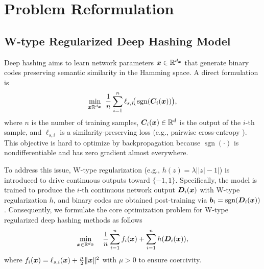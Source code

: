 \section{Problem Reformulation}
\label{Section: Problem Reformulation}
\subsection{W-type Regularized Deep Hashing Model}
Deep hashing aims to learn network parameters \(\bm{x} \in \mathbb{R}^{d_{\bm{x}}}\) that generate binary codes preserving semantic similarity in the Hamming space. A direct formulation is
\[
\min_{\bx \RR^{d_{\bx}}}\ \frac{1}{n}\sum_{i=1}^{n}\ell_{s,i}\!\big(\operatorname{sgn}(\bC_i(\bx))\big),
\]
where \(n\) is the number of training samples, \(\bm{C}_i(\bm{x})\in\mathbb{R}^d\) is the output of the \(i\)-th sample, and \(\ell_{s,i}\) is a similarity-preserving loss (e.g., pairwise cross-entropy \cite{zhuDeepHashingNetwork2016}). This objective is hard to optimize by backpropagation because \(\operatorname{sgn}(\cdot)\) is nondifferentiable and has zero gradient almost everywhere.

To address this issue, W-type regularization (e.g., \(h(z)=\lambda\bigl||z|-1\bigr|\)) is introduced to drive continuous outputs toward \(\{-1,1\}\).
Specifically, the model is trained to produce the \(i\)-th continuous network output \(\bm{D}_i(\bm{x})\) with W-type regularization \(h\), and binary codes are obtained post-training via \(\bm{b}_i = \operatorname{sgn}(\bm{D}_i(\bm{x}))\). Consequently, we formulate the core optimization problem for W-type regularized deep hashing methods as follows 
\begin{align}
\label{Eq: the primal deep hashing problem}
\min_{\bm{x} \in \mathbb{R}^{d_{\bm{x}}}} \quad \frac{1}{n}\sum_{i=1}^n f_i(\bm{x}) + \sum_{i=1}^n h(\bm{D}_i(\bm{x})),
\end{align}where \(f_i(\bm{x})=\ell_{s,i}(\bm{x})+\frac{\mu}{2}\|\bm{x}\|^2\) with \(\mu>0\) to ensure coercivity.
